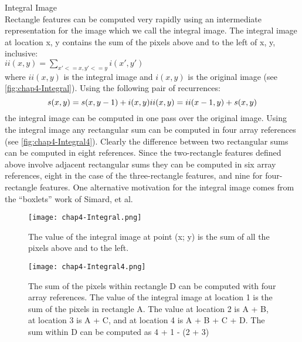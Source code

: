 \begin{compactitem}
\item {Integral Image}\\
Rectangle features can be computed very rapidly using an intermediate representation
for the image which we call the integral image. The integral image at location x, y
contains the sum of the pixels above and to the left of x, y, inclusive:\\
$ii(x, y) = \sum\limits_{x'<=x, y'<=y} i(x',y')$\\
where $ii(x, y)$ is the integral image and $i(x, y)$ is the original image (see \autoref{fig:chap4-Integral}).
Using the following pair of recurrences:
\begin{equation}
\label{eq:ii-recursive}
s(x,y) = s(x,y-1)+i(x,y) \\
ii(x,y) = ii(x-1,y)+s(x,y)
\end{equation}
the integral image can be computed in one pass over the original image.
Using the integral image any rectangular sum can be computed in four array references
(see  \autoref{fig:chap4-Integral4}). Clearly the difference between two rectangular sums can be
computed in eight references. Since the two-rectangle features defined above involve
adjacent rectangular sums they can be computed in six array references, eight in the
case of the three-rectangle features, and nine for four-rectangle features.
One alternative motivation for the integral image comes from the “boxlets” work
of Simard, et al.
\begin{figure}[h]
  \centering
	\texttt{[image: chap4-Integral.png]}
  \caption{The value of the integral image at point (x; y) is the sum of all the pixels
above and to the left.}
  \label{fig:chap4-Integral}
\end{figure}

\begin{figure}[h]
  \centering
	\texttt{[image: chap4-Integral4.png]}
  \caption{The sum of the pixels within rectangle D can be computed with four array
references. The value of the integral image at location 1 is the sum of the pixels in
rectangle A. The value at location 2 is A + B, at location 3 is A + C, and at location
4 is A + B + C + D. The sum within D can be computed as 4 + 1 - (2 + 3)}
  \label{fig:chap4-Integral4}
\end{figure}



\end{compactitem}
